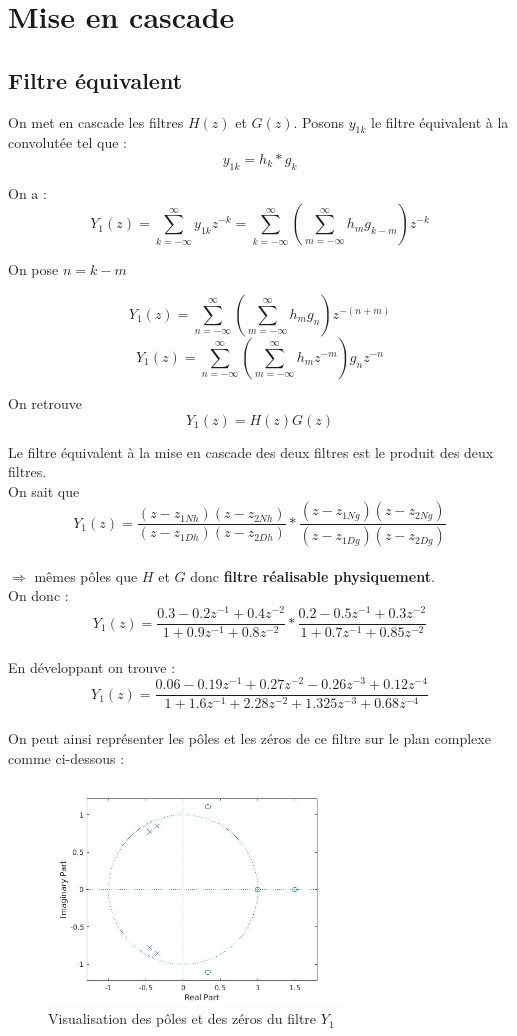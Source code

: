 \documentclass[12,french]{report}
\begin{document}
\chapter{Mise en cascade}

\section{Filtre équivalent}

On met en cascade les filtres $H(z)$ et $G(z)$. Posons $y_{1k}$ le filtre équivalent à la convolutée tel que : 
$$y_{1k}=h_k*g_k$$

On a :
$$ Y_1(z)=\sum_{k=-\infty}^{\infty}y_{1k}z^{-k}=\sum_{k=-\infty}^{\infty}\left(\sum_{m=-\infty}^{\infty}h_mg_{k-m}\right)z^{-k} $$

On pose $n=k-m$

$$ Y_1(z)=\sum_{n=-\infty}^{\infty}\left(\sum_{m=-\infty}^{\infty}h_mg_n\right)z^{-(n+m)} $$
$$ Y_1(z)=\sum_{n=-\infty}^{\infty}\left(\sum_{m=-\infty}^{\infty}h_mz^{-m}\right)g_nz^{-n} $$

On retrouve
$$ Y_1(z)=H(z)G(z) $$

Le filtre équivalent à la mise en cascade des deux filtres est le produit des deux filtres.\\

On sait que \\
$$ Y_1(z)= \frac{(z-z_{1Nh})(z-z_{2Nh})}{(z-z_{1Dh})(z-z_{2Dh})}*\frac{(z-z_{1Ng})(z-z_{2Ng})}{(z-z_{1Dg})(z-z_{2Dg})} $$\\
$\Longrightarrow$ mêmes pôles que $H$ et $G$ donc \textbf{filtre réalisable physiquement}.\\

On donc :
$$Y_1(z)= \frac{0.3-0.2z^{-1}+0.4z^{-2}}{1+0.9z^{-1}+0.8z^{-2}}*\frac{0.2-0.5z^{-1}+0.3z^{-2}}{1+0.7z^{-1}+0.85z^{-2}} $$\\

En développant on trouve :
$$Y_1(z)=\frac{0.06-0.19z^{-1}+0.27z^{-2}-0.26z^{-3}+0.12z^{-4}}{1+1.6z^{-1}+2.28z^{-2}+1.325z^{-3}+0.68z^{-4}} $$\\

On peut ainsi représenter les pôles et les zéros de ce filtre sur le plan complexe comme ci-dessous :

\begin{figure}[H]
	\center
	\includegraphics[width=0.7\textwidth]{./Images/zplane_Y1}
	\caption{Visualisation des pôles et des zéros du filtre $Y_1$}
\end{figure}\vspace{0.2cm}
\end{document}
